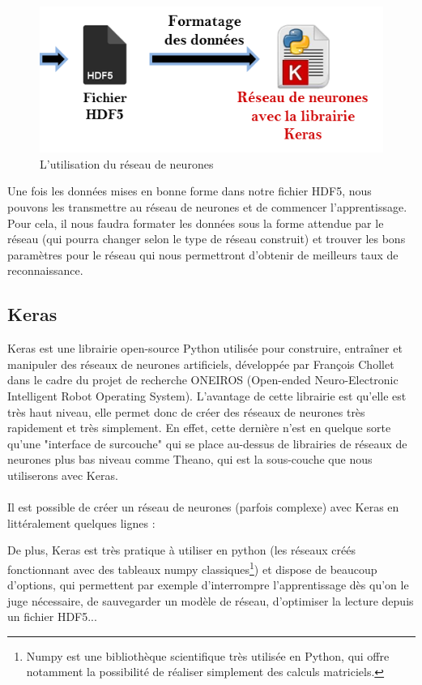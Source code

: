 \documentclass{article}
\begin{document}
\hphantom{.}
\begin{figure}[h]
  \centerline{\includegraphics[scale=0.9]{img/schema_reseau_keras.png}}
  \caption{L'utilisation du réseau de neurones}
\end{figure}

Une fois les données mises en bonne forme dans notre fichier HDF5, nous pouvons les transmettre au réseau de neurones et de commencer l'apprentissage. Pour cela, il nous faudra formater les données sous la forme attendue par le réseau (qui pourra changer selon le type de réseau construit) et trouver les bons paramètres pour le réseau qui nous permettront d'obtenir de meilleurs taux de reconnaissance.

\subsection{Keras}

Keras\cite{docKeras} est une librairie open-source Python utilisée pour construire, entraîner et manipuler des réseaux de neurones artificiels, développée par François Chollet dans le cadre du projet de recherche ONEIROS (Open-ended Neuro-Electronic Intelligent Robot Operating System). L'avantage de cette librairie est qu'elle est très haut niveau, elle permet donc de créer des réseaux de neurones très rapidement et très simplement. En effet, cette dernière n'est en quelque sorte qu'une "interface de surcouche" qui se place au-dessus de librairies de réseaux de neurones plus bas niveau comme Theano, qui est la sous-couche que nous utiliserons avec Keras.\\
 \\
Il est possible de créer un réseau de neurones (parfois complexe) avec Keras en littéralement quelques lignes :\\


De plus, Keras est très pratique à utiliser en python (les réseaux créés fonctionnant avec des tableaux numpy classiques\footnote{Numpy est une bibliothèque scientifique très utilisée en Python, qui offre notamment la possibilité de réaliser simplement des calculs matriciels.}) et dispose de beaucoup d'options, qui permettent par exemple d'interrompre l'apprentissage dès qu'on le juge nécessaire, de sauvegarder un modèle de réseau, d'optimiser la lecture depuis un fichier HDF5...
\end{document}
